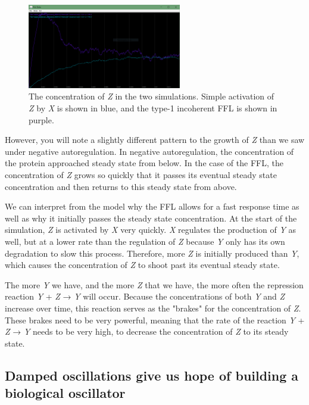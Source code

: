\begin{figure}[h]
\centering
\mySfFamily
\includegraphics[width = 0.6\textwidth]{../images/ffl_chart.png}
\caption{The concentration of \textit{Z} in the two simulations. Simple activation of \textit{Z} by \textit{X} is shown in blue, and the type-1 incoherent FFL is shown in purple.}
\label{fig:ffl_chart}
\end{figure}

However, you will note a slightly different pattern to the growth of \textit{Z} than we saw under negative autoregulation. In negative autoregulation, the concentration of the protein approached steady state from below. In the case of the FFL, the concentration of \textit{Z} grows so quickly that it passes its eventual steady state concentration and then returns to this steady state from above.

We can interpret from the model why the FFL allows for a fast response time as well as why it initially passes the steady state concentration. At the start of the simulation, \textit{Z} is activated by \textit{X} very quickly. \textit{X} regulates the production of \textit{Y} as well, but at a lower rate than the regulation of \textit{Z} because \textit{Y} only has its own degradation to slow this process. Therefore, more \textit{Z} is initially produced than \textit{Y}, which causes the concentration of \textit{Z} to shoot past its eventual steady state.

The more \textit{Y} we have, and the more \textit{Z} that we have, the more often the repression reaction \textit{Y} + \textit{Z} → \textit{Y} will occur. Because the concentrations of both \textit{Y} and \textit{Z} increase over time, this reaction serves as the "brakes" for the concentration of \textit{Z}. These brakes need to be very powerful, meaning that the rate of the reaction \textit{Y} + \textit{Z} → \textit{Y} needs to be very high, to decrease the concentration of \textit{Z} to its steady state.

\FloatBarrier
{}
\subsection{Damped oscillations give us hope of building a biological oscillator}


